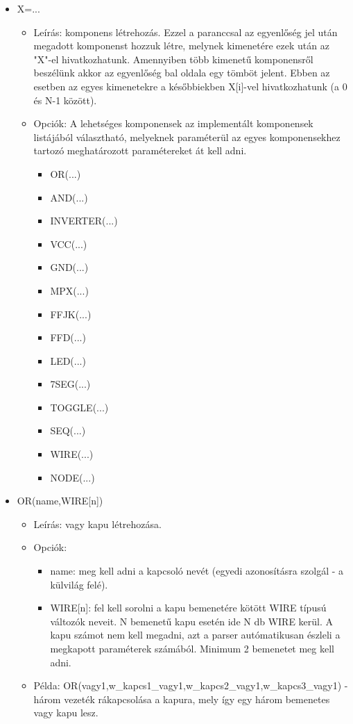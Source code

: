 \begin{itemize}
\item X=...
	\begin{itemize}
	\item Leírás: komponens létrehozás. Ezzel a paranccsal az egyenlőség jel után megadott komponenst hozzuk létre, melynek kimenetére ezek után az "X"-el hivatkozhatunk. Amennyiben több kimenetű komponensről beszélünk akkor az egyenlőség bal oldala egy tömböt jelent. Ebben az esetben az egyes kimenetekre a későbbiekben X[i]-vel hivatkozhatunk (a 0 és N-1 között).
	\item Opciók: A lehetséges komponensek az implementált komponensek listájából választható, melyeknek paraméterül az egyes komponensekhez tartozó meghatározott paramétereket át kell adni.
		\begin{itemize}
			\item OR(...)			%
			\item AND(...)			%
			\item INVERTER(...)		%
			\item VCC(...)			%
			\item GND(...)			%
			\item MPX(...)			%
			\item FFJK(...)			%
			\item FFD(...)			%
			\item LED(...)			%
			\item 7SEG(...)			%
			\item TOGGLE(...)		%
			\item SEQ(...)			%
			\item WIRE(...)			%
			\item NODE(...)			%
		\end{itemize}
	\end{itemize}

\item OR(name,WIRE[n])
	\begin{itemize}
	\item Leírás: vagy kapu létrehozása.
	\item Opciók: 
		\begin{itemize}
			\item name: meg kell adni a kapcsoló nevét (egyedi azonosításra szolgál - a külvilág felé).
			\item WIRE[n]: fel kell sorolni a kapu bemenetére kötött WIRE típusú változók neveit. N bemenetű kapu esetén ide N db WIRE kerül. A kapu számot nem kell megadni, azt a parser autómatikusan észleli a megkapott paraméterek számából. Minimum 2 bemenetet meg kell adni.
		\end{itemize}
	\item Példa: OR(vagy1,w\_kapcs1\_vagy1,w\_kapcs2\_vagy1,w\_kapcs3\_vagy1) - három vezeték rákapcsolása a kapura, mely így egy három bemenetes vagy kapu lesz.
	\end{itemize}


\end{itemize}
